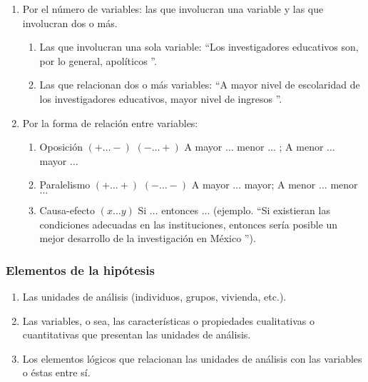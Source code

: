 \begin{enumerate}[noitemsep]
 \item Por el número de variables: las que involucran una variable y las que involucran dos o más.
    \begin{enumerate}
      \item Las que involucran una sola variable: \textquotedblleft Los investigadores educativos son, por lo general, apolíticos \textquotedblright.
      \item Las que relacionan dos o más variables: \textquotedblleft A mayor nivel de escolaridad de los investigadores educativos, mayor nivel de ingresos \textquotedblright.
    \end{enumerate}
 
\item Por la forma de relación entre variables:

\begin{enumerate} [noitemsep]
 \item Oposición $(+ \ldots -)$  $(- \ldots +)$    A mayor $ \ldots $ menor $ \ldots $ ;   A menor $ \ldots $ mayor $ \ldots $
 \item Paralelismo $(+ \ldots +)$   $(- \ldots -)$   A mayor $ \ldots $ mayor;    A menor $ \ldots $ menor $ \ldots $
 \item Causa-efecto  $(x \ldots y)$  Si $ \ldots $ entonces $ \ldots $ (ejemplo.  \textquotedblleft Si existieran las condiciones adecuadas en las instituciones, entonces sería posible un mejor desarrollo de la investigación en México \textquotedblright).
\end{enumerate}

\end{enumerate}

\subsubsection{Elementos de la hipótesis}

\begin{enumerate}[noitemsep]
 \item Las unidades de análisis (individuos, grupos, vivienda, etc.).
 \item Las variables, o sea, las características o propiedades cualitativas o cuantitativas que presentan las unidades de análisis.
 \item Los elementos lógicos que relacionan las unidades de análisis con las variables o éstas entre sí.
\end{enumerate}


